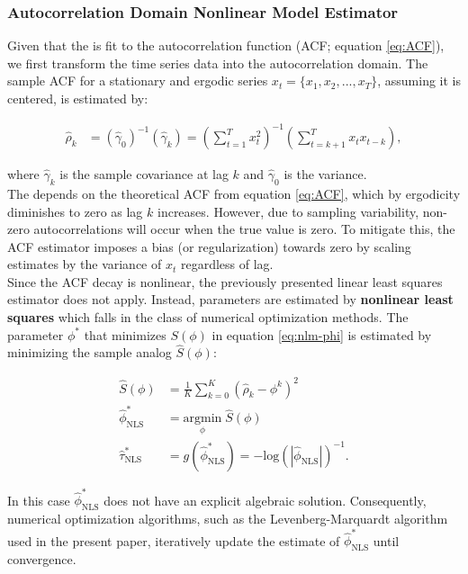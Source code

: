 \documentclass[main.tex]{subfiles}
\begin{document}
\subsubsection{Autocorrelation Domain Nonlinear Model Estimator}

Given that the  is fit to the autocorrelation function (ACF; equation \eqref{eq:ACF}), we first transform the time series data into the autocorrelation domain. The sample ACF for a stationary and ergodic series $x_t = \{x_1, x_2, ..., x_T\}$, assuming it is centered, is estimated by:

\begin{align}\label{eq:ACF_}
    \hat\rho_k &= (\hat\gamma_0)^{-1}(\hat\gamma_k) = (\sum_{t=1}^T x_t^2)^{-1} (\sum_{t=k+1}^{T}x_t x_{t-k}),
\end{align}

\noindent where $\hat\gamma_k$ is the sample covariance at lag $k$ and $\hat\gamma_0$ is the variance.\\


The  depends on the theoretical ACF from equation \eqref{eq:ACF}, which by ergodicity diminishes to zero as lag $k$ increases. However, due to sampling variability, non-zero autocorrelations will occur when the true value is zero. To mitigate this, the ACF estimator imposes a bias (or regularization) towards zero by scaling estimates by the variance of $x_t$ regardless of lag.\\


Since the ACF decay is nonlinear, the previously presented linear least squares estimator does not apply. Instead, parameters are estimated by \textbf{nonlinear least squares} which falls in the class of numerical optimization methods. The parameter $\phi^*$ that minimizes $S(\phi)$ in equation \eqref{eq:nlm-phi} is estimated by minimizing the sample analog $\hat S(\phi)$:

\begin{align}
    \hat S(\phi) &= \frac{1}{K} \sum_{k=0}^K (\hat\rho_k - \phi^k)^2\\
    \hat \phi^*_{\scriptscriptstyle\text{NLS}} &= \underset{\phi}{\text{argmin}} \; \hat S(\phi)\\
    \hat \tau^*_{\scriptscriptstyle\text{NLS}} &= g(\hat \phi^*_{\scriptscriptstyle\text{NLS}}) = -{\text{log}(|\hat\phi_{\scriptscriptstyle\text{NLS}}|)}^{-1}.
\end{align}

\noindent In this case $\hat \phi^*_{\scriptscriptstyle\text{NLS}}$ does not have an explicit algebraic solution. Consequently, numerical optimization algorithms, such as the Levenberg-Marquardt \citep{watson_levenberg-marquardt_1978} algorithm used in the present paper, iteratively update the estimate of $\hat \phi^*_{\scriptscriptstyle\text{NLS}}$ until convergence. \\
\end{document}
